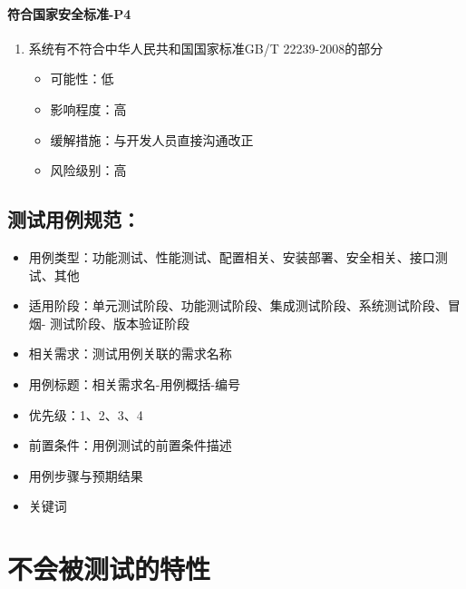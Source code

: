 \documentclass[hyperref, a4paper]{ctexart}
\providecommand{\tightlist}{%
  \setlength{\itemsep}{0pt}\setlength{\parskip}{0pt}}
\let\oldparagraph\paragraph
\renewcommand{\paragraph}[1]{\oldparagraph{#1}\mbox{}}
\begin{document}
\hypertarget{ux7b26ux5408ux56fdux5bb6ux5b89ux5168ux6807ux51c6-p4}{%
\paragraph{符合国家安全标准-P4}\label{ux7b26ux5408ux56fdux5bb6ux5b89ux5168ux6807ux51c6-p4}}

\begin{enumerate}
\def\labelenumi{\arabic{enumi}.}
\tightlist
\item
  系统有不符合中华人民共和国国家标准GB/T 22239-2008的部分

  \begin{itemize}
  \tightlist
  \item
    可能性：低
  \item
    影响程度：高
  \item
    缓解措施：与开发人员直接沟通改正
  \item
    风险级别：高
  \end{itemize}
\end{enumerate}

\hypertarget{ux6d4bux8bd5ux7528ux4f8bux89c4ux8303}{%
\subsection{测试用例规范：}\label{ux6d4bux8bd5ux7528ux4f8bux89c4ux8303}}

\begin{itemize}
\tightlist
\item
  用例类型：功能测试、性能测试、配置相关、安装部署、安全相关、接口测试、其他
\item
  适用阶段：单元测试阶段、功能测试阶段、集成测试阶段、系统测试阶段、冒烟-
  测试阶段、版本验证阶段
\item
  相关需求：测试用例关联的需求名称
\item
  用例标题：相关需求名-用例概括-编号
\item
  优先级：1、2、3、4
\item
  前置条件：用例测试的前置条件描述
\item
  用例步骤与预期结果
\item
  关键词
\end{itemize}

\hypertarget{ux4e0dux4f1aux88abux6d4bux8bd5ux7684ux7279ux6027}{%
\section{不会被测试的特性}\label{ux4e0dux4f1aux88abux6d4bux8bd5ux7684ux7279ux6027}}
\end{document}
